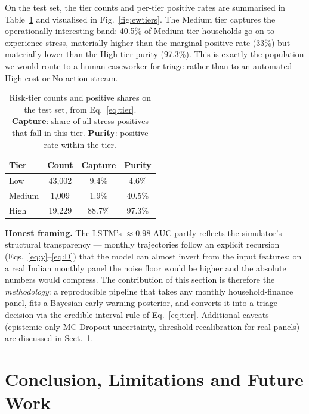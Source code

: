 \documentclass[colorlinks,balance]{asmeconf}
\begin{document}
On the test set, the tier counts and per-tier positive rates are summarised in Table~\ref{tab:tier} and visualised in Fig.~\ref{fig:ewtiers}. The Medium tier captures the operationally interesting band: 40.5\% of Medium-tier households go on to experience stress, materially higher than the marginal positive rate (33\%) but materially lower than the High-tier purity (97.3\%). This is exactly the population we would route to a human caseworker for triage rather than to an automated High-cost or No-action stream.

\begin{table}[!htb]
\caption{Risk-tier counts and positive shares on the test set, from Eq.~\eqref{eq:tier}. \textbf{Capture}: share of all stress positives that fall in this tier. \textbf{Purity}: positive rate within the tier.}\label{tab:tier}
\centering
\begin{tabular}{lccc}
\toprule
Tier & Count & Capture & Purity \\
\midrule
Low    & 43{,}002 & 9.4\%  & 4.6\%  \\
Medium & 1{,}009  & 1.9\%  & 40.5\% \\
High   & 19{,}229 & 88.7\% & 97.3\% \\
\bottomrule
\end{tabular}
\end{table}

\textbf{Honest framing.} The LSTM's $\approx\!0.98$ AUC partly reflects the simulator's structural transparency --- monthly trajectories follow an explicit recursion (Eqs.~\eqref{eq:y}--\eqref{eq:D}) that the model can almost invert from the input features; on a real Indian monthly panel the noise floor would be higher and the absolute numbers would compress. The contribution of this section is therefore the \emph{methodology}: a reproducible pipeline that takes any monthly household-finance panel, fits a Bayesian early-warning posterior, and converts it into a triage decision via the credible-interval rule of Eq.~\eqref{eq:tier}. Additional caveats (epistemic-only MC-Dropout uncertainty, threshold recalibration for real panels) are discussed in Sect.~\ref{sec:conclusion}.

\section{Conclusion, Limitations and Future Work}\label{sec:conclusion}
\end{document}
